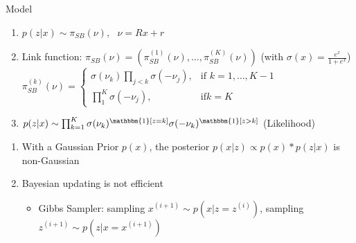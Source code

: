 \documentclass{beamer}
\begin{document}
\begin{frame}{Model}%
       \begin{tcolorbox}[colback=blue!10!white,colframe=blue!50!black,title=Stick Breaking Logitstic Regression \cite{linderman2015dependent},boxrule=2pt, boxsep=0.1em, left=0.1em, right=0.1em,
fontupper=\fontsize{8}{10}\selectfont] %
\begin{enumerate}[\textbullet]

\item $p(z|x) \sim \pi_{SB}(\nu),\text{ } \nu=Rx+r$
\item Link function: $\pi_{SB}(\nu)=\left( \pi_{SB}^{(1)}(\nu),\dots,\pi_{SB}^{(K)}(\nu) \right)$ (with $\sigma(x)=\frac{e^x}{1+e^x}$)\\
$\pi_{SB}^{(k)}(\nu)=\begin{cases}
    \sigma(\nu_k) \prod_{j<k}\sigma(-\nu_j),& \text{if } k=1,\dots,K-1\\
    \prod_{1}^K \sigma(-\nu_j),              & \text{if} k=K
\end{cases}$\\

\item 
$p(z|x) \sim \prod _{k=1}^K \sigma(\nu_k)^{\mathbbm{1} [z=k]} \sigma(-\nu_k)^{\mathbbm{1} [z>k]}$ (Likelihood)
\end{enumerate}
\end{tcolorbox}
\begin{enumerate}[\textbullet]
\item With a Gaussian Prior $p(x)$, the posterior $p(x|z)\propto p(x)*p(z|x)$ is non-Gaussian
\item Bayesian updating is not efficient
\begin{itemize}
            \item Gibbs Sampler: sampling $x^{(i+1)} \sim p(x|z=z^{(i)})$, sampling $z^{(i+1)} \sim p(z|x=x^{(i+1)})$			


\end{itemize}
\end{enumerate}


    \end{frame}
\end{document}
